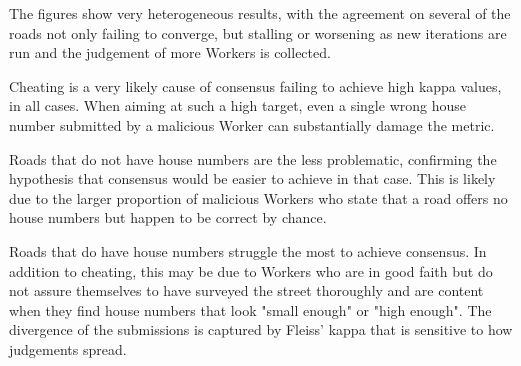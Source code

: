 \begin{figure}[!ht]
    \begin{floatrow}
   \end{floatrow}
\end{figure}
        
The figures show very heterogeneous results, with the agreement on several of the roads not only failing to converge, but stalling or worsening as new iterations are run and the judgement of more Workers is collected. 

Cheating is a very likely cause of consensus failing to achieve high kappa values, in all cases. When aiming at such a high target, even a single wrong house number submitted by a malicious Worker can substantially damage the metric.

Roads that do not have house numbers are the less problematic, confirming the hypothesis that consensus would be easier to achieve in that case. This is likely due to the larger proportion of malicious Workers who state that a road offers no house numbers but happen to be correct by chance.

Roads that do have house numbers struggle the most to achieve consensus. In addition to cheating, this may be due to Workers who are in good faith but do not assure themselves to have surveyed the street thoroughly and are content when they find house numbers that look "small enough" or "high enough". The divergence of the submissions is captured by Fleiss' kappa that is sensitive to how judgements spread.